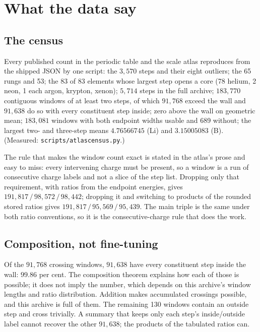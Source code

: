 \documentclass[11pt]{article}
\renewcommand{\_}{\origunderscore\allowbreak}
\begin{document}
\section{What the data say}\label{sec:data}

\subsection{The census}

Every published count in the periodic table and the scale atlas reproduces from the shipped JSON
by one script: the $3{,}570$ steps and their eight outliers; the 65 rungs and 53; the 83 of 83
elements whose largest step opens a core (78 helium, 2 neon, 1 each argon, krypton, xenon);
$5{,}714$ steps in the full archive; $183{,}770$ contiguous windows of at least two steps, of
which $91{,}768$ exceed the wall and $91{,}638$ do so with every constituent step inside; zero
above the wall on geometric mean; $183{,}081$ windows with both endpoint widths usable and 689
without; the largest two- and three-step means $4.76566745$ (Li) and $3.15005083$ (B).
(Measured: \texttt{scripts/atlas\_census.py}.)

The rule that makes the window count exact is stated in the atlas's prose and easy to miss: every
intervening charge must be present, so a window is a run of consecutive charge labels and not a
slice of the step list. Dropping only that requirement, with ratios from the endpoint energies,
gives $191{,}817\,/\,98{,}572\,/\,98{,}442$; dropping it and switching to products of the rounded
stored ratios gives $191{,}817\,/\,95{,}569\,/\,95{,}439$. The main triple is the same under both
ratio conventions, so it is the consecutive-charge rule that does the work.

\subsection{Composition, not fine-tuning}

Of the $91{,}768$ crossing windows, $91{,}638$ have every constituent step inside the wall:
$99.86$ per cent. The composition theorem explains how each of those is possible; it does not
imply the number, which depends on this archive's window lengths and ratio distribution. Addition
makes accumulated crossings possible, and this archive is full of them. The remaining 130 windows
contain an outside step and cross trivially. A summary that keeps only each step's inside/outside
label cannot recover the other $91{,}638$; the products of the tabulated ratios can.
\end{document}
